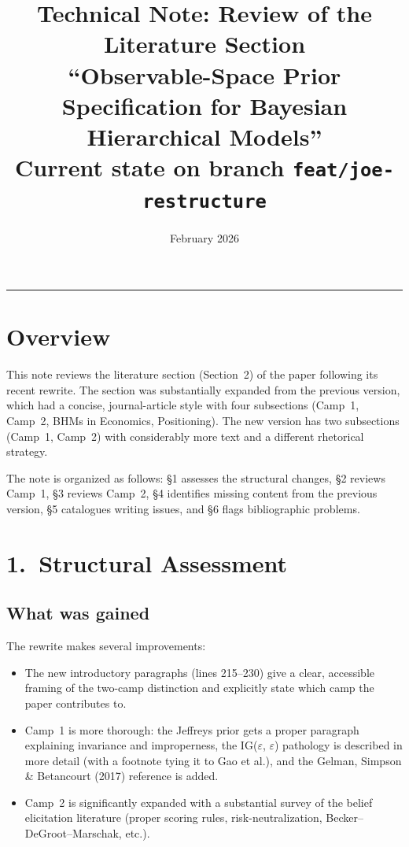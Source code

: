\documentclass[12pt,a4paper]{article}
\title{Technical Note: Review of the Literature Section\\[6pt]
\large ``Observable-Space Prior Specification for Bayesian Hierarchical
Models''\\[6pt]
\normalsize Current state on branch \texttt{feat/joe-restructure}}
\author{}
\date{February 2026}
\begin{document}
\maketitle
\thispagestyle{empty}

\vspace{1em}
\hrule
\vspace{1em}

\section{Overview}

This note reviews the literature section (Section~2) of the paper following its
recent rewrite. The section was substantially expanded from the previous
version, which had a concise, journal-article style with four subsections
(Camp~1, Camp~2, BHMs in Economics, Positioning). The new version has two
subsections (Camp~1, Camp~2) with considerably more text and a different
rhetorical strategy.

The note is organized as follows: \S1 assesses the structural changes, \S2
reviews Camp~1, \S3 reviews Camp~2, \S4 identifies missing content from the
previous version, \S5 catalogues writing issues, and \S6 flags bibliographic
problems.


\section{1.\ Structural Assessment}

\subsection{What was gained}

The rewrite makes several improvements:

\begin{itemize}[leftmargin=1.5em]
  \item The new introductory paragraphs (lines 215--230) give a clear,
    accessible framing of the two-camp distinction and explicitly state which
    camp the paper contributes to.
  \item Camp~1 is more thorough: the Jeffreys prior gets a proper paragraph
    explaining invariance and improperness, the IG($\varepsilon$,
    $\varepsilon$) pathology is described in more detail (with a footnote
    tying it to Gao et al.), and the Gelman, Simpson \& Betancourt (2017)
    reference is added.
  \item Camp~2 is significantly expanded with a substantial survey of the
    belief elicitation literature (proper scoring rules, risk-neutralization,
    Becker--DeGroot--Marschak, etc.).
\end{itemize}
\end{document}
